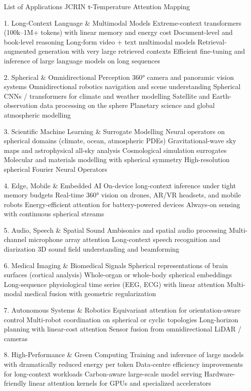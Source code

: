 List of Applications  
JCRIN τ-Temperature Attention Mapping

1. Long-Context Language & Multimodal Models
Extreme-context transformers (100k–1M+ tokens) with linear memory and energy cost
Document-level and book-level reasoning
Long-form video + text multimodal models
Retrieval-augmented generation with very large retrieved contexts
Efficient fine-tuning and inference of large language models on long sequences

2. Spherical & Omnidirectional Perception
360° camera and panoramic vision systems
Omnidirectional robotics navigation and scene understanding
Spherical CNNs / transformers for climate and weather modelling
Satellite and Earth-observation data processing on the sphere
Planetary science and global atmospheric modelling

3. Scientific Machine Learning & Surrogate Modelling
Neural operators on spherical domains (climate, ocean, atmospheric PDEs)
Gravitational-wave sky maps and astrophysical all-sky analysis
Cosmological simulation surrogates
Molecular and materials modelling with spherical symmetry
High-resolution spherical Fourier Neural Operators

4. Edge, Mobile & Embedded AI
On-device long-context inference under tight memory budgets
Real-time 360° vision on drones, AR/VR headsets, and mobile robots
Energy-efficient attention for battery-powered devices
Always-on sensing with continuous spherical streams

5. Audio, Speech & Spatial Sound
Ambisonics and spatial audio processing
Multi-channel microphone array attention
Long-context speech recognition and diarization
3D sound field understanding and beamforming

6. Medical Imaging & Biomedical Signals
Spherical representations of brain surfaces (cortical analysis)
Whole-organ or whole-body spherical embeddings
Long-sequence physiological time series (EEG, ECG) with linear attention
Multi-modal medical fusion with geometric regularization

7. Autonomous Systems & Robotics
Equivariant attention for orientation-aware control
Multi-robot coordination on spherical or cyclic topologies
Long-horizon planning with linear-cost attention
Sensor fusion from omnidirectional LiDAR / cameras

8. High-Performance & Green Computing
Training and inference of large models with dramatically reduced energy per token
Data-centre efficiency improvements for long-context workloads
Carbon-aware large-scale model serving
Hardware-friendly linear attention kernels for GPUs and specialized accelerators


